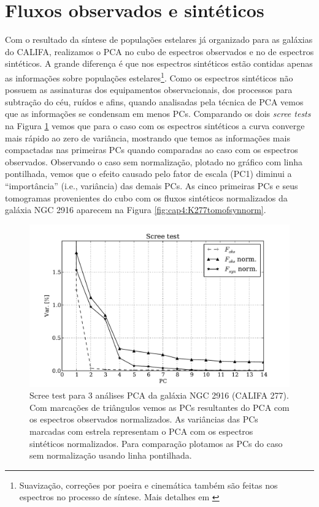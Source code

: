 \section{Fluxos observados e sintéticos}
\label{sec:cap4:OBSxSYN}

Com o resultado da síntese de populações estelares já organizado para as galáxias do CALIFA, realizamos o PCA no cubo de
espectros observados e no de espectros sintéticos. A grande diferença é que nos espectros sintéticos estão contidas
apenas as informações sobre populações estelares\footnote{Suavização, correções por poeira e cinemática também são
feitas nos espectros no processo de síntese. Mais detalhes em \citet{CidFernandes2005}}. Como os espectros sintéticos
não possuem as assinaturas dos equipamentos observacionais, dos processos para subtração do céu, ruídos e afins, quando
analisadas pela técnica de PCA vemos que as informações se condensam em menos PCs. Comparando os dois {\em scree tests}
na Figura \ref{fig:cap4:K0277scree} vemos que para o caso com os espectros sintéticos a curva converge mais rápido ao
zero de variância, mostrando que temos as informações mais compactadas nas primeiras PCs quando comparadas ao caso com
os espectros observados. Observando o caso sem normalização, plotado no gráfico com linha pontilhada, vemos que o efeito
causado pelo fator de escala (PC1) diminui a ``importância'' (i.e., variância) das demais PCs. As cinco primeiras PCs e
seus tomogramas provenientes do cubo com os fluxos sintéticos normalizados da galáxia NGC 2916 aparecem na Figura
\ref{fig:cap4:K277tomofsynnorm}.

\begin{figure}
    \includegraphics[width=1.\textwidth]{figuras/K0277-screetest.pdf}
    \caption[Scree test comparativo entre 3 PCAs.]
    {Scree test para 3 análises PCA da galáxia NGC 2916 (CALIFA 277). Com marcações de triângulos vemos as PCs
    resultantes do PCA com os espectros observados normalizados. As variâncias das PCs marcadas com estrela representam
    o PCA com os espectros sintéticos normalizados. Para comparação plotamos as PCs do caso sem normalização usando
    linha pontilhada.}
    \label{fig:cap4:K0277scree}
\end{figure}

